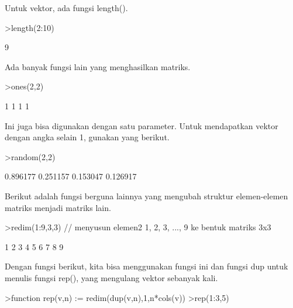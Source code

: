 \documentclass[a4paper,10pt]{article}
\begin{document}
\begin{eulernotebook}
\begin{eulercomment}
\begin{eulercomment}
\begin{eulercomment}
\begin{eulercomment}
\begin{eulercomment}
\begin{eulercomment}
\begin{eulercomment}
\begin{eulercomment}
\begin{eulercomment}
\begin{eulercomment}
\begin{eulercomment}
\begin{eulercomment}
\begin{eulercomment}
\begin{eulercomment}
\begin{eulercomment}
\begin{eulercomment}
\begin{eulercomment}
\begin{eulercomment}
\begin{eulercomment}
Untuk vektor, ada fungsi length().
\end{eulercomment}
\begin{eulerprompt}
>length(2:10)
\end{eulerprompt}
\begin{euleroutput}
  9
\end{euleroutput}
\begin{eulercomment}
Ada banyak fungsi lain yang menghasilkan matriks.
\end{eulercomment}
\begin{eulerprompt}
>ones(2,2)
\end{eulerprompt}
\begin{euleroutput}
              1             1 
              1             1 
\end{euleroutput}
\begin{eulercomment}
Ini juga bisa digunakan dengan satu parameter. Untuk mendapatkan
vektor dengan angka selain 1, gunakan yang berikut.
\end{eulercomment}
\begin{eulerprompt}
>random(2,2)
\end{eulerprompt}
\begin{euleroutput}
       0.896177      0.251157 
       0.153047      0.126917 
\end{euleroutput}
\begin{eulercomment}
Berikut adalah fungsi berguna lainnya yang mengubah struktur
elemen-elemen matriks menjadi matriks lain.
\end{eulercomment}
\begin{eulerprompt}
>redim(1:9,3,3) // menyusun elemen2 1, 2, 3, ..., 9 ke bentuk matriks 3x3
\end{eulerprompt}
\begin{euleroutput}
              1             2             3 
              4             5             6 
              7             8             9 
\end{euleroutput}
\begin{eulercomment}
Dengan fungsi berikut, kita bisa menggunakan fungsi ini dan fungsi dup
untuk menulis fungsi rep(), yang mengulang vektor sebanyak kali.
\end{eulercomment}
\begin{eulerprompt}
>function rep(v,n) := redim(dup(v,n),1,n*cols(v))
>rep(1:3,5)
\end{eulerprompt}
\begin{euleroutput}

\end{euleroutput}
\end{eulercomment}
\end{eulercomment}
\end{eulercomment}
\end{eulercomment}
\end{eulercomment}
\end{eulercomment}
\end{eulercomment}
\end{eulercomment}
\end{eulercomment}
\end{eulercomment}
\end{eulercomment}
\end{eulercomment}
\end{eulercomment}
\end{eulercomment}
\end{eulercomment}
\end{eulercomment}
\end{eulercomment}
\end{eulercomment}
\end{eulernotebook}
\end{document}
